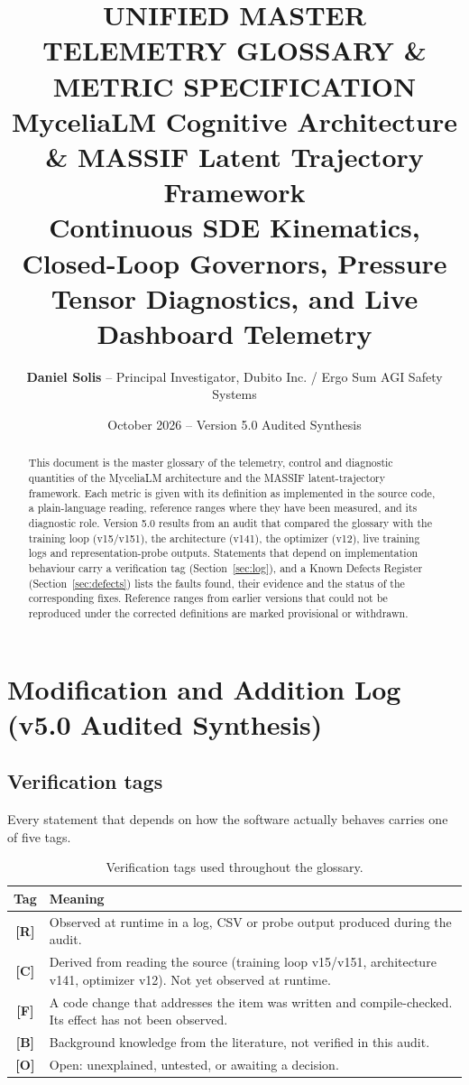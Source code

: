 \documentclass[11pt,a4paper]{article}
\title{\vspace{-1.5cm}\Large \textbf{UNIFIED MASTER TELEMETRY GLOSSARY \& METRIC SPECIFICATION}\\
\large \textcolor{docblue}{MyceliaLM Cognitive Architecture \& MASSIF Latent Trajectory Framework}\\
\small \textsf{Continuous SDE Kinematics, Closed-Loop Governors, Pressure Tensor Diagnostics, and Live Dashboard Telemetry}}
\author{\textbf{Daniel Solis} -- Principal Investigator, Dubito Inc. / Ergo Sum AGI Safety Systems}
\date{October 2026 -- Version 5.0 Audited Synthesis}
\newcommand{\sR}{\textbf{[R]}}
\newcommand{\sC}{\textbf{[C]}}
\newcommand{\sF}{\textbf{[F]}}
\newcommand{\sB}{\textbf{[B]}}
\newcommand{\sO}{\textbf{[O]}}
\begin{document}
\maketitle

\begin{abstract}
\noindent This document is the master glossary of the telemetry, control and diagnostic quantities of the MyceliaLM architecture and the MASSIF latent-trajectory framework. Each metric is given with its definition as implemented in the source code, a plain-language reading, reference ranges where they have been measured, and its diagnostic role. Version 5.0 results from an audit that compared the glossary with the training loop (v15/v151), the architecture (v141), the optimizer (v12), live training logs and representation-probe outputs. Statements that depend on implementation behaviour carry a verification tag (Section~\ref{sec:log}), and a Known Defects Register (Section~\ref{sec:defects}) lists the faults found, their evidence and the status of the corresponding fixes. Reference ranges from earlier versions that could not be reproduced under the corrected definitions are marked provisional or withdrawn.
\end{abstract}

\tableofcontents
\newpage

\section{Modification and Addition Log (v5.0 Audited Synthesis)}\label{sec:log}

\subsection{Verification tags}
Every statement that depends on how the software actually behaves carries one of five tags.
\begin{table}[h]
\centering
\begin{tabular}{@{}cp{14.2cm}@{}}
\toprule
\textbf{Tag} & \textbf{Meaning}\\
\midrule
\sR{} & Observed at runtime in a log, CSV or probe output produced during the audit.\\
\sC{} & Derived from reading the source (training loop v15/v151, architecture v141, optimizer v12). Not yet observed at runtime.\\
\sF{} & A code change that addresses the item was written and compile-checked. Its effect has not been observed.\\
\sB{} & Background knowledge from the literature, not verified in this audit.\\
\sO{} & Open: unexplained, untested, or awaiting a decision.\\
\bottomrule
\end{tabular}
\caption{Verification tags used throughout the glossary.}
\end{table}
\end{document}
